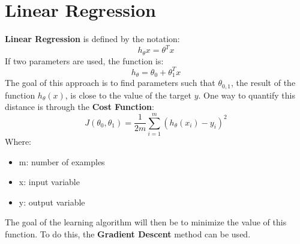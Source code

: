\section{Linear Regression}

\textbf{Linear Regression} is defined by the notation:
\begin{equation} \tag{Linear Regression}
    h_\theta x = \theta^T x
\end{equation}
If two parameters are used, the function is:
\begin{equation} \tag{Linear Regression}
    h_\theta = \theta_0 + \theta_1^T x
\end{equation}
The goal of this approach is to find parameters such that $\theta_{0,1}$, the result of the function $h_\theta(x)$, is close to the value of the target $y$.  One way to quantify this distance is through the \textbf{Cost Function}:
\begin{equation} \tag{Cost Function}
    J(\theta_0,\theta_1) = \frac{1}{2m} \sum_{i=1}^m (h_{\theta}(x_i)-y_i)^2
\end{equation}
Where:
\begin{itemize}
    \item m: number of examples
    \item x: input variable
    \item y: output variable
\end{itemize}
The goal of the learning algorithm will then be to minimize the value of this function. To do this, the \textbf{Gradient Descent} method can be used.

\newpage